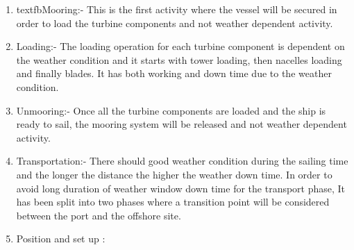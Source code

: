 \begin{enumerate}
\item textfb{Mooring}:- This is the first activity where the vessel will be secured in order to load the turbine components and not weather dependent activity.
\item Loading:- The loading operation for each turbine component is dependent on the weather condition and it starts with tower loading, then nacelles loading and finally blades. It has both working and down time due to the weather condition.
\item Unmooring:- Once all the turbine components are loaded and the ship is ready to sail, the mooring system will be released and not weather dependent activity.
\item Transportation:- There should good weather condition during the sailing time and the longer the distance the higher the weather down time. In order to avoid long duration of weather window down time  for the transport phase, It has been split into two phases where a transition point will be considered between the port and the offshore site.
\item Position and set up : 
\end{enumerate}